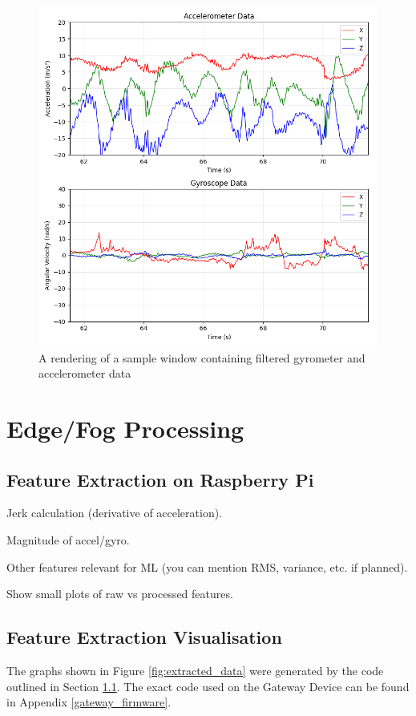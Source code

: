 \documentclass[conference]{IEEEtran}
\begin{document}
\begin{figure}[h]
	\centering
	\includegraphics[width=0.9\columnwidth]{media/Figure_1.png}
	\caption{A rendering of a sample window containing filtered gyrometer and accelerometer data}
	\label{fig:basic_data}
\end{figure}

\section{Edge/Fog Processing}
\subsection{Feature Extraction on Raspberry Pi}\label{feature_extraction}
Jerk calculation (derivative of acceleration).

Magnitude of accel/gyro.

Other features relevant for ML (you can mention RMS, variance, etc. if planned).

Show small plots of raw vs processed features.

\subsection{Feature Extraction Visualisation}
The graphs shown in Figure \ref{fig:extracted_data} were generated by the code outlined in Section  \ref{feature_extraction}. The exact code used on the Gateway Device can be found in Appendix \ref{gateway_firmware}.
\end{document}
